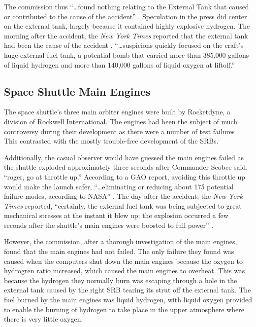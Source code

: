 The commission thus ``\ldots found nothing relating to the
External Tank that caused or contributed to the cause of the
accident'' \cite[vol. 1, p. 42]{rogers}. Speculation in the
press did center on the external tank, largely because it
contained highly explosive hydrogen.
The morning after the accident, the {\em New York Times}
reported that the external tank had been the cause of the
accident \cite[p. A1]{nytexternal}, ``\ldots suspicions
quickly focused on the craft's huge external fuel tank, a
potential bomb that carried more than 385,000 gallons of
liquid hydrogen and more than 140,000 gallons of liquid
oxygen at liftoff.''

\subsection{Space Shuttle Main Engines}

The space shuttle's three main orbiter engines were built by
Rocketdyne, a division of Rockwell International.
The engines had been the subject of much
controversy during their development as there were a number
of test failures \cite{lewis}.
This contrasted with the mostly trouble-free development of
the SRBs.

Additionally, the casual observer would have guessed the
main engines failed as the shuttle exploded approximately
three seconds after Commander Scobee said, ``roger, go at
throttle up.''
According to a GAO report, avoiding this throttle up
would make the launch safer, ``\ldots eliminating or
reducing about 175 potential failure modes, according to
NASA''
\cite{gao89}.  The day after the accident, the {\em New York
Times} reported, ``certainly, the external fuel tank was
being subjected to great mechanical stresses at the instant
it blew up; the explosion occurred a few seconds after the
shuttle's main engines were boosted to full power''
\cite[p. A4]{nytexternal}.

However, the commission, after a thorough investigation of
the main engines, found that the main engines had not failed.
The only failure they found was caused when the computers
shut down the main engines because the oxygen to hydrogren
ratio increased, which caused the main engines to overheat.
This was because the hydrogen they normally burn was
escaping through a hole in the external tank caused by the
right SRB tearing its strut off the external tank.
The fuel burned by the main engines was liquid hydrogen, with
liquid oxygen provided to enable the burning of hydrogen to take
place in the upper atmosphere where there is very little
oxygen.

